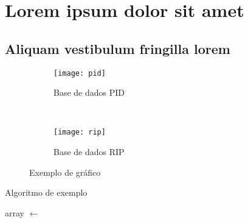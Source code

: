 \chapter{Lorem ipsum dolor sit amet}\label{cap:exampleChapter}
\section{Aliquam vestibulum fringilla lorem}

\lipsum[1]



\lipsum[2-3]


\lipsum[2-3]
\begin{figure}
    \centering
    \begin{subfigure}[b]{0.45\textwidth}
        \texttt{[image: pid]}
        \caption{Base de dados PID}
        \label{fig:pid}
    \end{subfigure}
    ~ 
    \begin{subfigure}[b]{0.45\textwidth}
        \texttt{[image: rip]}
        \caption{Base de dados RIP}
        \label{fig:rip}
    \end{subfigure}
    \caption{Exemplo de gráfico}\label{fig:animals}
\end{figure}
\lipsum[2]

\begin{algorithm}
\caption{Algoritmo de exemplo}\label{bogosort}
  \begin{algorithmic}[1]
    \State array $\gets$  
    \EndWhile
  \EndProcedure
  \end{algorithmic}
\end{algorithm}

\lipsum[1]